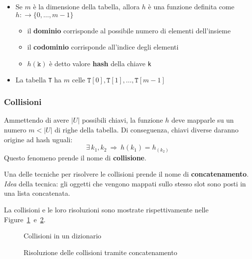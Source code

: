 \documentclass[italian, 10pt]{article}
\begin{document}
\begin{itemize}
  \item Se \(m\) è la dimensione della tabella, allora \(h\) è una funzione definita come \(h: \rightarrow \{0, \ldots, m-1\}\)
        \begin{itemize}
          \item il \textbf{dominio} corrisponde al possibile numero di elementi dell'insieme
          \item il \textbf{codominio} corrisponde all'indice degli elementi
          \item \(h(\texttt{k})\) è detto valore \textbf{hash} della chiave \texttt{k}
        \end{itemize}
  \item La tabella \texttt{T} ha \(m\) celle \(\texttt{T}[0], \texttt{T}[1], \ldots, \texttt{T}[m-1]\)
\end{itemize}

\subsubsection{Collisioni}

Ammettendo di avere \(|U|\) possibili chiavi, la funzione \(h\) deve mapparle su un numero \(m < |U|\) di righe della tabella.
Di conseguenza, chiavi diverse daranno origine ad hash uguali:
\[\exists \, k_1, k_2 \ \Rightarrow \ h(k_1) = h_(k_2) \]
Questo fenomeno prende il nome di \textbf{collisione}.

Una delle tecniche per risolvere le collisioni prende il nome di \textbf{concatenamento}.
\textit{Idea} della tecnica: gli oggetti che vengono mappati sullo stesso slot sono posti in una lista concatenata.

\bigskip
La collisioni e le loro risoluzioni sono mostrate rispettivamente nelle Figure~\ref{fig:collisioni-dizionario}~e~\ref{fig:risoluzione-collisioni-dizionario}.

\begin{figure}[htbp]
  \bigskip
  \centering
  \caption{Collisioni in un dizionario}
  \label{fig:collisioni-dizionario}
  \bigskip
\end{figure}

\begin{figure}[htbp]
  \bigskip
  \centering
  \caption{Risoluzione delle collisioni tramite concatenamento}
  \label{fig:risoluzione-collisioni-dizionario}
  \bigskip
\end{figure}
\end{document}
